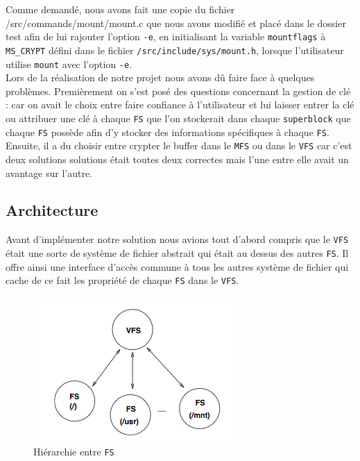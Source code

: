 \documentclass[10pt, onecolumn] {IEEEtran}
\begin{document}
Comme demandé, nous avons fait une copie du fichier /src/commands/mount/mount.c que nous avons modifié et placé dans le dossier test afin de lui rajouter l'option \texttt{-e}, en initialisant la variable \texttt{mountflags} à \texttt{MS\_CRYPT} défini dans le fichier \texttt{/src/include/sys/mount.h}, lorsque l'utilisateur utilise \texttt{mount} avec l'option \texttt{-e}. \\

Lors de la réalisation de notre projet nous avons dû faire face à quelques problèmes. Premièrement on s'est posé des questions concernant la gestion de clé : car on avait le choix entre faire confiance à l'utilisateur et lui laisser entrer la clé ou attribuer une clé à chaque \texttt{FS} que l'on stockerait dans chaque \texttt{superblock} que chaque \texttt{FS} possède afin d'y stocker des informations spécifiques à chaque \texttt{FS}.  Ensuite, il a du choisir entre crypter le buffer dans le \texttt{MFS} ou dans le \texttt{VFS} car c'est deux solutions solutions était toutes deux correctes mais l'une entre elle avait un avantage sur l'autre.\\   

\subsection{Architecture}

Avant d'implémenter notre solution nous avions tout d'abord compris que le \texttt{VFS} était une sorte de système de fichier abstrait qui était au dessus des autres \texttt{FS}. Il offre ainsi une interface d'accès commune à tous les autres système de fichier qui cache de ce fait les propriété de chaque \texttt{FS} dans le \texttt{VFS}. 

\begin{figure}[h]
\begin{center}
\includegraphics [scale=0.5] {figures/VFS-FS.png} 
\caption{Hiérarchie entre \texttt{FS}}
\label{default}
\end{center}
\end{figure}
     
\end{document}
